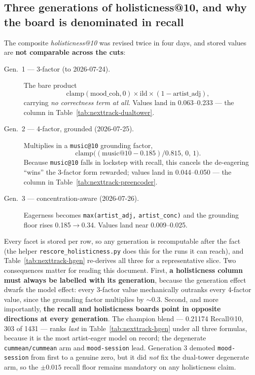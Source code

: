 \documentclass[11pt]{article}
\begin{document}
\subsection{Three generations of holisticness@10, and why the board is denominated in recall}
\label{sec:nexttrack-power-generations}
The composite \emph{holisticness@10} was revised twice in four days, and stored
values are \textbf{not comparable across the cuts}:
\begin{description}
  \item[Gen.\ 1 --- 3-factor (to 2026-07-24).] The bare product
  \[\mathrm{clamp}(\text{mood\_coh},0)\times\text{ild}\times(1-\text{artist\_adj}),\]
  carrying \emph{no correctness term at all}. Values land in
  \numrange{0.063}{0.233} --- the column in Table~\ref{tab:nexttrack-dualtower}.
  \item[Gen.\ 2 --- 4-factor, grounded (2026-07-25).] Multiplies in a
  \texttt{music@10} grounding factor,
  \[\mathrm{clamp}\bigl((\text{music@10}-\num{0.185})/\num{0.815},\,0,\,1\bigr).\]
  Because \texttt{music@10} falls in lockstep with recall, this cancels the
  de-eagering ``wins'' the 3-factor form rewarded; values land in
  \numrange{0.044}{0.050} --- the column in Table~\ref{tab:nexttrack-preencoder}.
  \item[Gen.\ 3 --- concentration-aware (2026-07-26).] Eagerness becomes
  \texttt{max(artist\_adj,} \texttt{artist\_conc)} and the grounding floor
  rises \num{0.185}$\to$\num{0.34}. Values land near \numrange{0.009}{0.025}.
\end{description}
Every facet is stored per row, so any generation is recomputable after the fact
(the helper \texttt{rescore\_holisticness.py} does this for the runs it can
reach),
and Table~\ref{tab:nexttrack-hgen} re-derives all three for a representative slice. Two
consequences matter for reading this document. First, \textbf{a holisticness
column must always be labelled with its generation}, because the generation
effect dwarfs the model effect: every 3-factor value mechanically outranks every
4-factor value, since the grounding factor multiplies by ${\sim}0.3$. Second,
and more importantly, \textbf{the recall and holisticness boards point in
opposite directions at every generation}. The champion blend --- \num{0.21174}
Recall@10, \num{303} of \num{1431} --- ranks \emph{last} in
Table~\ref{tab:nexttrack-hgen} under all three formulas, because it is the most
artist-eager model on record; the degenerate \texttt{cummean/cummean} arm and
\texttt{mood-session} lead. Generation 3 demoted \texttt{mood-session} from
first to a genuine zero, but it did \emph{not} fix the dual-tower degenerate arm,
so the $\pm\num{0.015}$ recall floor remains mandatory on any holisticness claim.
\end{document}
